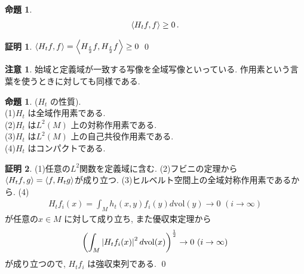 \documentclass[10pt, fleqn, label-section=none]{bxjsarticle}
\theoremstyle{definition}
\newtheorem{prop}[dfn]{命題}
\newtheorem*{pf*}{証明}
\newtheorem{remark}[dfn]{注意}
\newcommand{\paren}[1]{\mleft( #1\mright )}
\newcommand{\tbra}[1]{\mleft\langle#1\mright\rangle}
\newcommand{\abs}[1]{\left|#1\right|}
\newcommand{\vol}{\textrm{vol}}
\renewcommand{\-}{\hyphen}
\begin{document}
\begin{prop}
\begin{align*} \tbra{H_t f, f} \geq 0  \, .\end{align*}
\end{prop}
\begin{pf*}
$\tbra{H_tf, f} = \tbra{H_{\frac{t}{2} } f,  H_{\frac{t}{2} } f} \geq 0$
\qed
\end{pf*}


\begin{remark}
始域と定義域が一致する写像を全域写像といっている. 作用素という言葉を使うときに対しても同様である.
\end{remark}

\begin{prop}($H_t$ の性質). \\
(1)$H_t$ は全域作用素である. \\
(2)$H_t$ は$L^2(M)$ 上の対称作用素である. \\
(3)$H_t$ は$L^2(M)$ 上の自己共役作用素である. \\
(4)$H_t$ はコンパクトである. \\
\end{prop}
\begin{pf*}
(1)任意の$L^2$関数を定義域に含む. (2)フビニの定理から$\tbra{H_t f , g} = \tbra{f, H_t g}$が成り立つ. (3)ヒルベルト空間上の全域対称作用素であるから. (4)
\begin{align*} H_t f_i (x) = \int_M h_t (x,y) f_i (y) d \vol(y) \rightarrow 0 \,\, (i \rightarrow \infty ) \end{align*} 
が任意の$x \in M$ に対して成り立ち, また優収束定理から
\begin{align*} \paren{\int_M \abs{H_t f_i (x)}^2 d \vol(x)}^{\frac{1}{2}} \rightarrow 0 \,\, (i \rightarrow \infty )\end{align*}
が成り立つので, $H_t f_i$ は強収束列である. 
\qed
\end{pf*}
\end{document}
